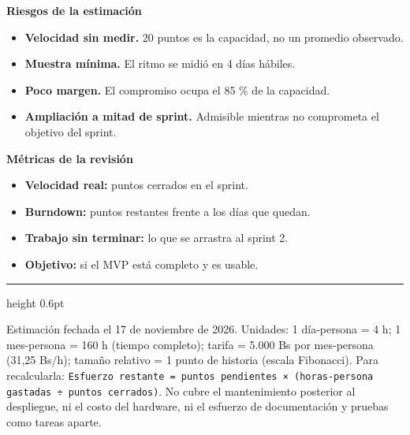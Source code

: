 \documentclass[10pt,letterpaper]{article}
\begin{document}
\begin{minipage}[t]{0.49\textwidth}
{\small\textbf{Riesgos de la estimación}\par}
\vspace{2pt}
{\small
\begin{itemize}
\item \textbf{Velocidad sin medir.} 20 puntos es la capacidad, no un
  promedio observado.
\item \textbf{Muestra mínima.} El ritmo se midió en 4 días hábiles.
\item \textbf{Poco margen.} El compromiso ocupa el 85 \% de la capacidad.
\item \textbf{Ampliación a mitad de sprint.} Admisible mientras no
  comprometa el objetivo del sprint.
\end{itemize}}
\end{minipage}\hfill
\begin{minipage}[t]{0.49\textwidth}
{\small\textbf{Métricas de la revisión}\par}
\vspace{2pt}
{\small
\begin{itemize}
\item \textbf{Velocidad real:} puntos cerrados en el sprint.
\item \textbf{Burndown:} puntos restantes frente a los días que quedan.
\item \textbf{Trabajo sin terminar:} lo que se arrastra al sprint 2.
\item \textbf{Objetivo:} si el MVP está completo y es usable.
\end{itemize}}
\end{minipage}

\vspace{4pt}
{\color{linea}\hrule height 0.6pt}\vspace{3pt}
{\footnotesize\color{gris}
Estimación fechada el 17 de noviembre de 2026. Unidades: 1 día-persona = 4 h;
1 mes-persona = 160 h (tiempo completo); tarifa = 5.000 Bs por mes-persona
(31,25 Bs/h); tamaño relativo = 1 punto de historia (escala Fibonacci).
Para recalcularla:
\texttt{Esfuerzo restante = puntos pendientes × (horas-persona gastadas ÷ puntos cerrados)}.
No cubre el mantenimiento posterior al despliegue, ni el costo del hardware,
ni el esfuerzo de documentación y pruebas como tareas aparte.}
\end{document}
